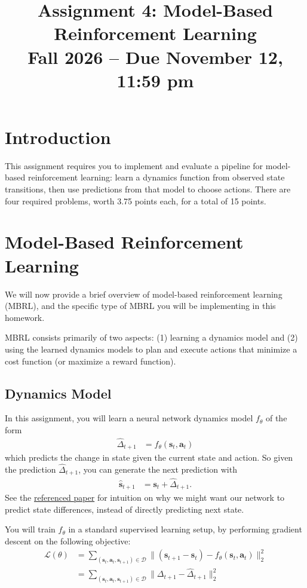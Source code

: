 \documentclass{article} %
\title{Assignment 4: Model-Based Reinforcement Learning\\
\textbf{Fall 2026 -- Due November 12, 11:59 pm}}
\author{}
\date{}
\newcommand{\bs}{\mathbf{s}}
\newcommand{\ba}{\mathbf{a}}
\begin{document}
\maketitle


\section{Introduction}

This assignment requires you to implement and evaluate a pipeline for model-based reinforcement learning: learn a dynamics function from observed state transitions, then use predictions from that model to choose actions. There are four required problems, worth 3.75 points each, for a total of 15 points.



\section{Model-Based Reinforcement Learning}

We will now provide a brief overview of model-based reinforcement learning (MBRL), and the specific type of MBRL you will be implementing in this homework.

MBRL consists primarily of two aspects: (1) learning a dynamics model and (2) using the learned dynamics models to plan and execute actions that minimize a cost function (or maximize a reward function).

\subsection{Dynamics Model}

In this assignment, you will learn a neural network dynamics model $f_\theta$ of the form
\begin{align}
\hat{\Delta}_{t+1} &= f_\theta(\bs_t, \ba_t)
\end{align}
which predicts the change in state given the current state and action. So given the prediction $\hat{\Delta}_{t+1}$, you can generate the next prediction with
\begin{align}
\hat{\bs}_{t+1} &= \bs_t + \hat{\Delta}_{t+1} .
\end{align}
See the \href{https://arxiv.org/pdf/1708.02596.pdf}{referenced paper} for intuition on why we might want our network to predict state differences, instead of directly predicting next state.

You will train $f_\theta$ in a standard supervised learning setup, by performing gradient descent on the following objective:
\begin{align}
\mathcal{L}(\theta) &= \sum_{(\bs_t, \ba_t, \bs_{t+1}) \in \mathcal{D}} \| (\bs_{t+1} - \bs_t) - f_\theta(\bs_t, \ba_t) \|_2^2 \\
&= \sum_{(\bs_t, \ba_t, \bs_{t+1}) \in \mathcal{D}} \| \Delta_{t+1} - \hat{\Delta}_{t+1} \|_2^2 \label{eqn:train-dynamics}
\end{align}
\end{document}
